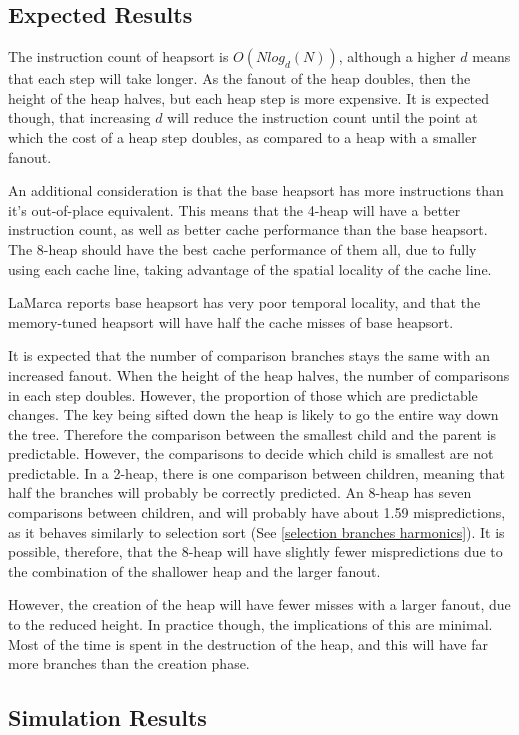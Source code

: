 \subsection{Expected Results}
The instruction count of heapsort is $O(Nlog_d(N))$, although a higher $d$ means
that each step will take longer. As the fanout of the heap doubles, then the
height of the heap halves, but each heap step is more expensive. It is expected
though, that increasing $d$ will reduce the instruction count until the point at
which the cost of a heap step doubles, as compared to a heap with a smaller
fanout.

An additional consideration is that the base heapsort has more instructions than
it's out-of-place equivalent. This means that the 4-heap will have a better
instruction count, as well as better cache performance than the base heapsort.
The 8-heap should have the best cache performance of them all, due to fully
using each cache line, taking advantage of the spatial locality of the cache
line.

LaMarca reports base heapsort has very poor temporal locality, and that the
memory-tuned heapsort will have half the cache misses of base heapsort.

It is expected that the number of comparison branches stays the same with
an increased fanout. When the height of the heap halves, the number of
comparisons in each step doubles. However, the proportion of those which are
predictable changes. The key being sifted down the heap is likely to go the
entire way down the tree. Therefore the comparison between the smallest child
and the parent is predictable. However, the comparisons to decide which child is
smallest are not predictable. In a 2-heap, there is one comparison between
children, meaning that half the branches will probably be correctly predicted.
An 8-heap has seven comparisons between children, and will probably have about
1.59 mispredictions, as it behaves similarly to selection sort (See \ref{selection
branches harmonics}). It is possible, therefore, that the 8-heap will have slightly
fewer mispredictions due to the combination of the shallower heap and the larger
fanout.

However, the creation of the heap will have fewer misses with a larger fanout,
due to the reduced height. In practice though, the implications of this are
minimal. Most of the time is spent in the destruction of the heap, and this will
have far more branches than the creation phase.

\subsection{Simulation Results}

